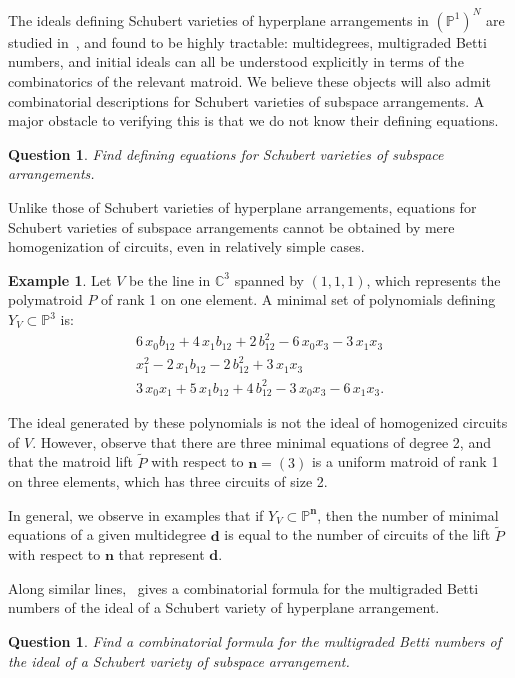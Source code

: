 \documentclass[11pt]{article}
\newtheorem{ques}[theo]{Question}
\theoremstyle{definition}
\newtheorem{exam}[theo]{Example}
\numberwithin{equation}{section}
\renewcommand{\P}{\mathbb{P}}
\newcommand{\C}{\mathbb{C}}
\newcommand{\revision}[1]{{#1}}
\begin{document}
\subsection{} The ideals defining Schubert varieties of hyperplane arrangements in $(\P^1)^N$ are studied in~\cite{AB16}, and found to be highly tractable: multidegrees, multigraded Betti numbers, and initial ideals can all be understood explicitly in terms of the combinatorics of the relevant matroid.
We believe these objects will also admit combinatorial descriptions for Schubert varieties of subspace arrangements.
A major obstacle to verifying this is that we do not know their defining equations.
\begin{ques}
  Find defining equations for Schubert varieties of subspace arrangements.
\end{ques}
Unlike those of Schubert varieties of hyperplane arrangements, equations for Schubert varieties of subspace arrangements cannot be obtained by mere homogenization of circuits, even in relatively simple cases.
\begin{exam}\label{zb:equations}
  Let $V$ be the line in $\C^3$ spanned by $(1,1,1)$, which represents the polymatroid $P$ of rank 1 on one element.
\revision{A minimal set of polynomials defining $Y_V \subset \P^3$ is:
  \begin{gather*}
    6\,x_{0}b_{12}+4\,x_{1}b_{12}+2\,b_{12}^{2}-6\,x_{0}x_{3}-3\,x_{1}x_{3} \\
    x_{1}^{2}-2\,x_{1}b_{12}-2\,b_{12}^{2}+3\,x_{1}x_{3} \\
    3\,x_{0}x_{1}+5\,x_{1}b_{12}+4\,b_{12}^{2}-3\,x_{0}x_{3}-6\,x_{1}x_{3}.
  \end{gather*}}
  \revision{The ideal generated by these polynomials is not the ideal of homogenized circuits of $V$.
  However, observe that there are three minimal equations of degree 2, and that the matroid lift $\widetilde P$ with respect to $\mathbf n = (3)$ is a uniform matroid of rank 1 on three elements, which has three circuits of size 2.

  In general, we observe in examples that if $Y_V \subset \P^{\mathbf n}$, then the number of
  minimal equations of a given multidegree $\mathbf d$ is equal to the number of circuits of the lift $\widetilde P$ with respect to $\mathbf n$ that represent $\mathbf d$.}
\end{exam}
Along similar lines,~\cite[Theorem 1.5]{AB16} gives a combinatorial formula for the multigraded Betti numbers of the ideal of a Schubert variety of hyperplane arrangement.
\begin{ques}
  Find a combinatorial formula for the multigraded Betti numbers of the ideal of a Schubert variety of subspace arrangement.
\end{ques}
\end{document}
